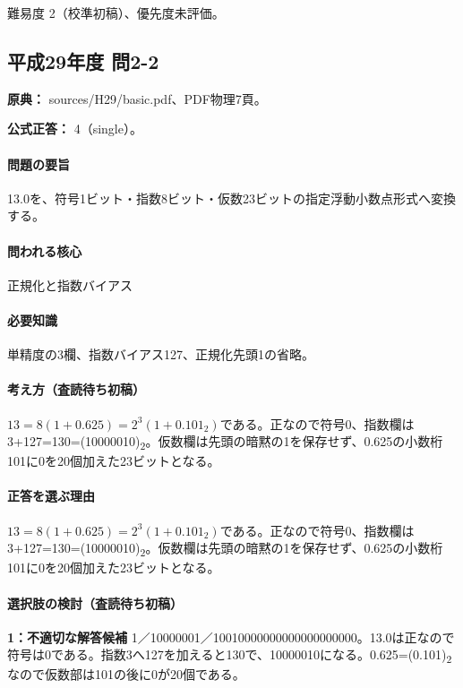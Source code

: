 \par 難易度 2（校準初稿）、優先度未評価。

\subsection{平成29年度 問2-2}
\label{q:h29-reg-basic-2-2}

\noindent\textbf{原典：} sources/H29/basic.pdf、PDF物理7頁。

\textbf{公式正答：} 4（single）。

\paragraph{問題の要旨} 13.0を、符号1ビット・指数8ビット・仮数23ビットの指定浮動小数点形式へ変換する。

\paragraph{問われる核心} 正規化と指数バイアス

\paragraph{必要知識} 単精度の3欄、指数バイアス127、正規化先頭1の省略。

\paragraph{考え方（査読待ち初稿）} \(13=8(1+0.625)=2^3(1+0.101_2)\)である。正なので符号0、指数欄は3+127=130=(10000010)\textsubscript{2}。仮数欄は先頭の暗黙の1を保存せず、0.625の小数桁101に0を20個加えた23ビットとなる。

\paragraph{正答を選ぶ理由} \(13=8(1+0.625)=2^3(1+0.101_2)\)である。正なので符号0、指数欄は3+127=130=(10000010)\textsubscript{2}。仮数欄は先頭の暗黙の1を保存せず、0.625の小数桁101に0を20個加えた23ビットとなる。

\paragraph{選択肢の検討（査読待ち初稿）}

\noindent\textbf{1：不適切な解答候補} 1／10000001／10010000000000000000000。13.0は正なので符号は0である。指数3へ127を加えると130で、10000010になる。0.625=(0.101)\textsubscript{2}なので仮数部は101の後に0が20個である。\par

